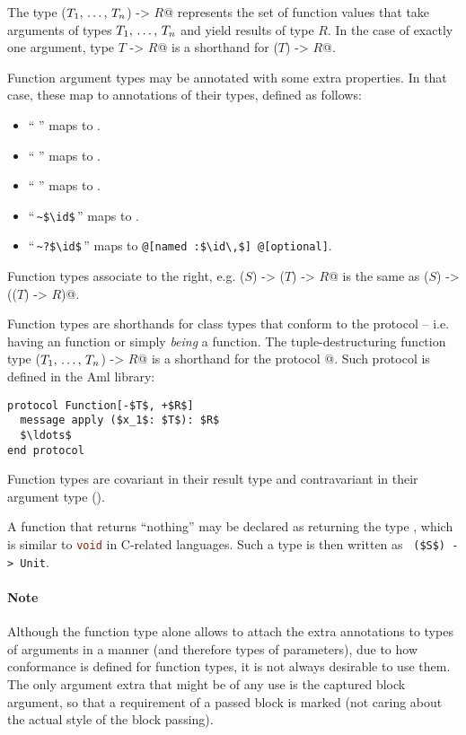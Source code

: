 The type \lstinline@($T_1 ,\, \ldots ,\, T_n$) -> $R$@ represents the set of function values that take arguments of types $T_1 ,\, \ldots ,\, T_n$ and yield results of type $R$. In the case of exactly one argument, type \lstinline@$T$ -> $R$@ is a shorthand for \lstinline@($T$) -> $R$@. 

Function argument types may be annotated with some extra properties. In that case, these map to annotations of their types, defined as follows:
\begin{itemize}
  \item ``\,\code{*}\,'' maps to . 
  \item ``\,\code{**}\,'' maps to . 
  \item ``\,\code{&}\,'' maps to . 
  \item ``\,\lstinline!~$\id$!\,'' maps to . 
  \item ``\,\lstinline!~?$\id$!\,'' maps to \lstinline[deletekeywords={optional}]!@[named :$\id\,$] @[optional]!. 
\end{itemize}

Function types associate to the right, e.g. \lstinline@($S$) -> ($T$) -> $R$@ is the same as \lstinline@($S$) -> (($T$) -> $R$)@. 

Function types are shorthands for class types that conform to the \lstinline@Function@ protocol -- i.e. having an  function or simply {\em being} a function. The tuple-destructuring function type \lstinline@($T_1 ,\, \ldots ,\, T_n$) -> $R$@ is a shorthand for the protocol \lstinline@Function[$T_1 * \ldots * T_n,\,R$]@. Such protocol is defined in the Aml library:

\begin{lstlisting}
protocol Function[-$T$, +$R$]
  message apply ($x_1$: $T$): $R$
  $\ldots$
end protocol
\end{lstlisting}

Function types are covariant in their result type and contravariant in their argument type ().

A function that returns ``nothing'' may be declared as returning the type , which is similar to \lstinline[language=C]!void! in C-related languages. Such a type is then written as ~\lstinline!($S$) -> Unit!. 

\paragraph{Note}
Although the function type alone allows to attach the extra annotations to types of arguments in a  manner (and therefore types of parameters), due to how conformance is defined for function types, it is not always desirable to use them. The only argument extra that might be of any use is the captured block argument, so that a requirement of a passed block is marked (not caring about the actual style of the block passing). 

